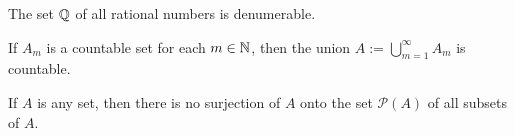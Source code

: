 \begin{theorem}
	The set $\mathbb{Q}$ of all rational numbers is denumerable.
\end{theorem}

\begin{theorem}
	If $A_m$ is a countable set for each $m \in \mathbb{N}$, then the union $A:= \bigcup\limits_{m=1}^{\infty} A_m$ is countable.
\end{theorem}

\begin{theorem}
	If $A$ is any set, then there is no surjection of $A$ onto the set $\mathcal{P}(A)$ of all subsets of $A$.
\end{theorem}
